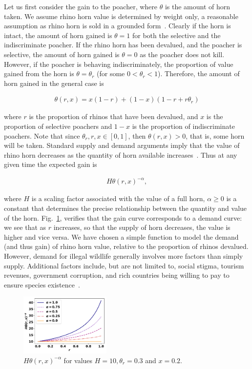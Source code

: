 \documentclass[10pt]{article}
\begin{document}
Let us first consider the gain to the poacher, where \(\theta\) is the amount of
horn taken. We assume rhino horn value is determined by weight only, a
reasonable assumption as rhino horn is sold in a grounded form~\cite{Saverhino}.
Clearly if the horn is intact, the amount of horn gained is \(\theta=1\) for
both the selective and the indiscriminate poacher.  If the rhino horn has been
devalued, and the poacher is selective, the amount of horn gained is
\(\theta=0\) as the poacher does not kill. However, if the poacher is behaving
indiscriminately, the proportion of value gained from the horn is \(\theta =
\theta_r\) (for some \(0<\theta_r<1\)). Therefore, the amount of horn gained in
the general case is

\begin{eqnarray}
    \label{eqn:theta}
    \theta(r, x) = x (1 - r) + (1 - x)(1-r+r\theta_r)
\end{eqnarray}

where \(r\) is the proportion of rhinos that have been devalued, and \(x\) is the
proportion of selective poachers and \(1-x\) is the proportion of indiscriminate
poachers. Note that since \(\theta_r, r, x  \in [0, 1]\), then
\(\theta(r, x) > 0\), that is, some horn will be taken. Standard supply and demand
arguments imply that the value
of rhino horn decreases as the quantity of horn available increases~\cite{mankiw2010}.
Thus at any given time the expected gain is

\begin{eqnarray}
    \label{eqn:individual_gain}
    H \theta(r, x)^{-\alpha},
\end{eqnarray}

where \(H\) is a scaling factor associated with the value of a full horn,
\(\alpha \geq 0\) is a constant that determines the precise relationship between
the quantity and value of the horn.  Fig.~\ref{fig:GainCurve}, verifies that the
gain curve corresponds to a demand curve: we see that as \(r\) increases, so that
the supply of horn decreases, the value is higher and vice versa. We have chosen
a simple function to model the demand (and thus gain) of rhino horn value,
relative to the proportion of rhinos devalued. However, demand for illegal
wildlife generally involves more factors than simply supply. Additional factors
include, but are not limited to, social stigma, tourism revenues, government
corruption, and rich countries being willing to pay to ensure species
existence~\cite{bulte1999economics, van2008protecting}.

\begin{figure}[!htbp]
\centering
\includegraphics[width=0.4\textwidth]{images/gain_curve.pdf}
\caption{\label{fig:GainCurve} \(H \theta(r, x) ^{- \alpha}\) for values
\(H = 10, \theta_r = 0.3\) and \(x = 0.2.\)}
\end{figure}
\end{document}

